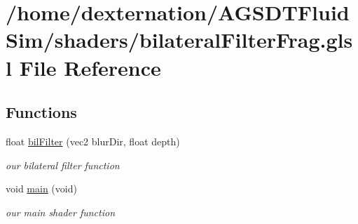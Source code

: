 \hypertarget{bilateral_filter_frag_8glsl}{\section{/home/dexternation/\-A\-G\-S\-D\-T\-Fluid\-Sim/shaders/bilateral\-Filter\-Frag.glsl File Reference}
\label{bilateral_filter_frag_8glsl}
}
\subsection*{Functions}
\begin{DoxyCompactItemize}
\item 
float \hyperlink{bilateral_filter_frag_8glsl_a4a4466509a3efe0b0eb00be16e5da684}{bil\-Filter} (vec2 blur\-Dir, float depth)
\begin{DoxyCompactList}\small\item\em our bilateral filter function \end{DoxyCompactList}\item 
\hypertarget{bilateral_filter_frag_8glsl_a6288eba0f8e8ad3ab1544ad731eb7667}{void \hyperlink{bilateral_filter_frag_8glsl_a6288eba0f8e8ad3ab1544ad731eb7667}{main} (void)}\label{bilateral_filter_frag_8glsl_a6288eba0f8e8ad3ab1544ad731eb7667}

\begin{DoxyCompactList}\small\item\em our main shader function \end{DoxyCompactList}\end{DoxyCompactItemize}
